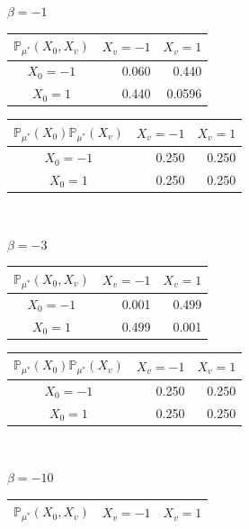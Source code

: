 \documentclass[12pt]{article}
\numberwithin{equation}{section}
\begin{document}
\begin{table}[h]
    \raggedright
    $\beta=-1$\\
    \centering
    \begin{tabular}{c|rr}
        $\mathbb{P}_{\mu^*}(X_0, X_v)$ & \multicolumn{1}{c}{$X_v=-1$} & \multicolumn{1}{c}{$X_v=1$} \\ \hline
        $X_0=-1$                       & 0.060                        & 0.440                       \\
        $X_0=1$                        & 0.440                        & 0.0596
    \end{tabular}
    \quad\quad
    \begin{tabular}{c|rr}
        $\mathbb{P}_{\mu^*}(X_0)\mathbb{P}_{\mu^*}(X_v)$ & \multicolumn{1}{c}{$X_v=-1$} & \multicolumn{1}{c}{$X_v=1$} \\ \hline
        $X_0=-1$                                         & 0.250                        & 0.250                       \\
        $X_0=1$                                          & 0.250                        & 0.250
    \end{tabular} \\
    \raggedright
    $\beta=-3$\\
    \centering
    \begin{tabular}{c|rr}
        $\mathbb{P}_{\mu^*}(X_0, X_v)$ & \multicolumn{1}{c}{$X_v=-1$} & \multicolumn{1}{c}{$X_v=1$} \\ \hline
        $X_0=-1$                       & 0.001                        & 0.499                       \\
        $X_0=1$                        & 0.499                        & 0.001
    \end{tabular}
    \quad\quad
    \begin{tabular}{c|rr}
        $\mathbb{P}_{\mu^*}(X_0)\mathbb{P}_{\mu^*}(X_v)$ & \multicolumn{1}{c}{$X_v=-1$} & \multicolumn{1}{c}{$X_v=1$} \\ \hline
        $X_0=-1$                                         & 0.250                        & 0.250                       \\
        $X_0=1$                                          & 0.250                        & 0.250
    \end{tabular} \\
    \raggedright
    $\beta=-10$\\
    \centering
    \begin{tabular}{c|rr}
        $\mathbb{P}_{\mu^*}(X_0, X_v)$ & \multicolumn{1}{c}{$X_v=-1$} & \multicolumn{1}{c}{$X_v=1$} \\ \hline

\end{tabular}
\end{table}
\end{document}
